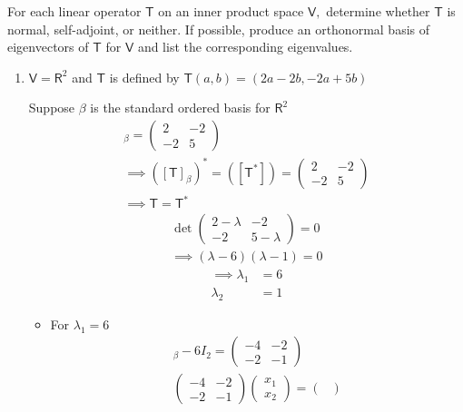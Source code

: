 For each linear operator $\mathsf{T}$ on an inner product space
$\mathsf{V},$ determine whether $\mathsf{T}$ is normal, self-adjoint,
or neither. If possible, produce an orthonormal basis of eigenvectors
of $\mathsf{T}$ for $\mathsf{V}$ and list the corresponding
eigenvalues.
\begin{enumerate}
\item $\mathsf{V} = \mathsf{R}^2$ and $\mathsf{T}$ is defined by
  $\mathsf{T}(a,b) = (2a-2b,-2a+5b)$

Suppose $\beta$ is the standard ordered basis for $\mathsf{R}^2$
\begin{gather}
[\mathsf{T}]_\beta = \begin{pmatrix}
2 & -2 \\
-2 & 5
\end{pmatrix}\\
\implies \left([\mathsf{T}]_\beta\right)^* =
\left([\mathsf{T}^*]\right) = \begin{pmatrix}
2 & -2\\
-2 & 5
\end{pmatrix}\\
\implies \mathsf{T} = \mathsf{T}^*
\end{gather}
\begin{gather}
\det{
\begin{pmatrix}
2-\lambda & -2\\
-2 & 5-\lambda
\end{pmatrix}
} = 0\\
\implies (\lambda -6)(\lambda-1) = 0
\end{gather}
\begin{align}
\implies \lambda_1 &= 6\\
\lambda_2 &= 1
\end{align}
\begin{itemize}
\item For $\lambda_1 = 6$
\begin{gather}
[\mathsf{T}]_\beta - 6I_2 = \begin{pmatrix}
-4 & -2\\
-2 & -1 
\end{pmatrix}\\
\begin{pmatrix}
-4 & -2\\
-2 & -1 
\end{pmatrix}
\begin{pmatrix}
x_1\\
x_2
\end{pmatrix}
=
\begin{pmatrix}

\end{pmatrix}
\end{gather}
\end{itemize}
\end{enumerate}
